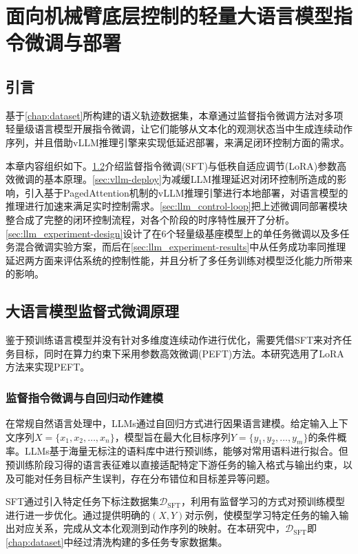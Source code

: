 \chapter{面向机械臂底层控制的轻量大语言模型指令微调与部署}\label{chap:finetune}

\section{引言}\label{sec:finetune-intro}
基于\cref{chap:dataset}所构建的语义轨迹数据集，本章通过监督指令微调方法对多项轻量级语言模型开展指令微调，让它们能够从文本化的观测状态当中生成连续动作序列，并且借助vLLM推理引擎来实现低延迟部署，来满足闭环控制方面的需求。

本章内容组织如下。\cref{sec:sft-principle}介绍监督指令微调(SFT)与低秩自适应调节(LoRA)参数高效微调的基本原理。\cref{sec:vllm-deploy}为减缓LLM推理延迟对闭环控制所造成的影响，引入基于PagedAttention机制的vLLM推理引擎进行本地部署，对语言模型的推理进行加速来满足实时控制需求。\cref{sec:llm_control-loop}把上述微调同部署模块整合成了完整的闭环控制流程，对各个阶段的时序特性展开了分析。\cref{sec:llm_experiment-design}设计了在6个轻量级基座模型上的单任务微调以及多任务混合微调实验方案，而后在\cref{sec:llm_experiment-results}中从任务成功率同推理延迟两方面来评估系统的控制性能，并且分析了多任务训练对模型泛化能力所带来的影响。
\section{大语言模型监督式微调原理}\label{sec:sft-principle}
鉴于预训练语言模型并没有针对多维度连续动作进行优化，需要凭借SFT来对齐任务目标，同时在算力约束下采用参数高效微调(PEFT)方法。本研究选用了LoRA\cite{hu2022lora}方法来实现PEFT。
\subsection{监督指令微调与自回归动作建模}
在常规自然语言处理中，LLMs通过自回归方式进行因果语言建模。给定输入上下文序列$X=\{x_1, x_2, \ldots, x_n\}$，模型旨在最大化目标序列$Y=\{y_1, y_2, \ldots, y_m\}$的条件概率。LLMs基于海量无标注的语料库中进行预训练，能够对常用语料进行拟合。但预训练阶段习得的语言表征难以直接适配特定下游任务的输入格式与输出约束，以及可能对任务目标产生误判，存在分布错位和目标差异等问题。

SFT通过引入特定任务下标注数据集$\mathcal{D}_{\text{SFT}}$，利用有监督学习的方式对预训练模型进行进一步优化。通过提供明确的$(X, Y)$对示例，使模型学习特定任务的输入输出对应关系，完成从文本化观测到动作序列的映射。在本研究中，$\mathcal{D}_{\text{SFT}}$即\cref{chap:dataset}中经过清洗构建的多任务专家数据集。

